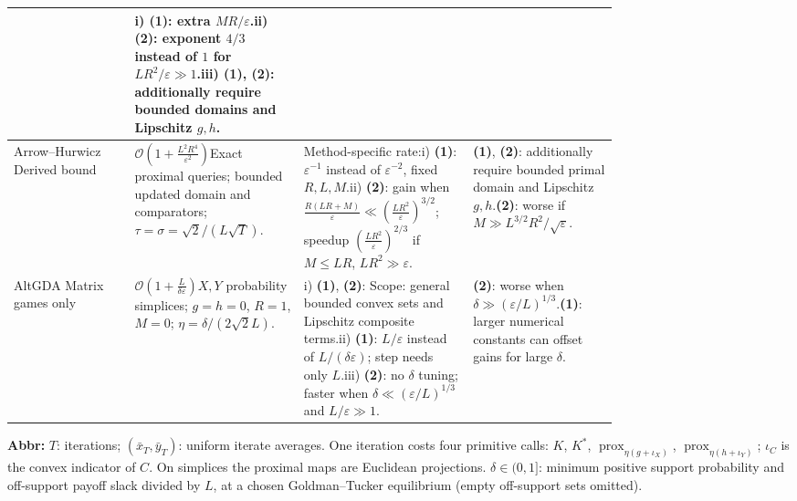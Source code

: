 \begin{table}[tp]
\begin{threeparttable}
\begin{tabularx}{\linewidth}{@{}>{\raggedright\arraybackslash}p{0.20\linewidth}>{\raggedright\arraybackslash}p{0.29\linewidth}>{\raggedright\arraybackslash}p{0.28\linewidth}>{\raggedright\arraybackslash}X@{}}
& i) \textbf{(1)}: extra $MR/\varepsilon$.\newline ii) \textbf{(2)}: exponent $4/3$ instead of $1$ for $LR^2/\varepsilon\gg1$.\newline iii) \textbf{(1)}, \textbf{(2)}: additionally require bounded domains and Lipschitz $g,h$. \\
\midrule
Arrow--Hurwicz \citep[\S3.2, Eq.~(20)]{BCSChambollePock2010}\newline Derived bound
& $\mathcal{O}\!\left(1+\frac{L^2R^4}{\varepsilon^2}\right)$\newline Exact proximal queries; bounded updated domain and comparators; $\tau=\sigma=\sqrt{2}/(L\sqrt{T})$.
& Method-specific rate:\newline i) \textbf{(1)}: $\varepsilon^{-1}$ instead of $\varepsilon^{-2}$, fixed $R,L,M$.\newline ii) \textbf{(2)}: gain when $\frac{R(LR+M)}{\varepsilon}\ll\left(\frac{LR^2}{\varepsilon}\right)^{3/2}$; speedup $\left(\frac{LR^2}{\varepsilon}\right)^{2/3}$ if $M\le LR$, $LR^2\gg\varepsilon$.
& \textbf{(1)}, \textbf{(2)}: additionally require bounded primal domain and Lipschitz $g,h$.\newline \textbf{(2)}: worse if $M\gg L^{3/2}R^2/\sqrt{\varepsilon}$. \\
\midrule
AltGDA \citep[Thm.~1, v1]{BCSNanEtAl2026}\newline Matrix games only
& $\mathcal{O}\!\left(1+\frac{L}{\delta\varepsilon}\right)$\newline $X,Y$ probability simplices; $g=h=0$, $R=1$, $M=0$; $\eta=\delta/(2\sqrt{2}L)$.
& i) \textbf{(1)}, \textbf{(2)}: Scope: general bounded convex sets and Lipschitz composite terms.\newline ii) \textbf{(1)}: $L/\varepsilon$ instead of $L/(\delta\varepsilon)$; step needs only $L$.\newline iii) \textbf{(2)}: no $\delta$ tuning; faster when $\delta\ll(\varepsilon/L)^{1/3}$ and $L/\varepsilon\gg1$.
& \textbf{(2)}: worse when $\delta\gg(\varepsilon/L)^{1/3}$.\newline \textbf{(1)}: larger numerical constants can offset gains for large $\delta$. \\
\bottomrule
\end{tabularx}
\begin{tablenotes}[flushleft]\footnotesize
\item[] \textbf{Abbr:} $T$: iterations; $(\bar x_T,\bar y_T)$: uniform iterate averages. One iteration costs four primitive calls: $K$, $K^*$, $\operatorname{prox}_{\eta(g+\iota_X)}$, $\operatorname{prox}_{\eta(h+\iota_Y)}$; $\iota_C$ is the convex indicator of $C$. On simplices the proximal maps are Euclidean projections. $\delta\in(0,1]$: minimum positive support probability and off-support payoff slack divided by $L$, at a chosen Goldman--Tucker equilibrium (empty off-support sets omitted).
\end{tablenotes}
\end{threeparttable}
\end{table}
\clearpage
